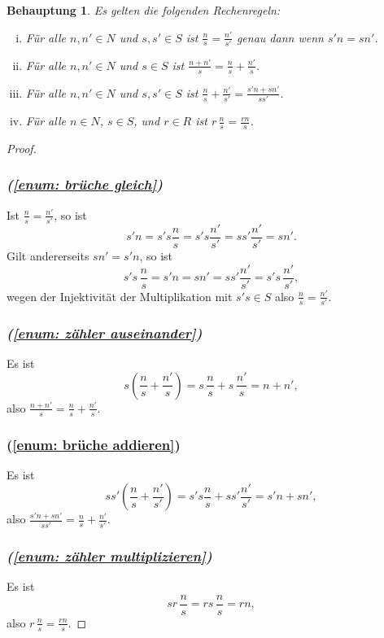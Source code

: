 \documentclass[a4paper,10pt]{article}
\newcounter{satze}
\newtheorem{beh}[satze]{Behauptung}
\theoremstyle{definition}
\begin{document}
\begin{beh}
 Es gelten die folgenden Rechenregeln:
 \begin{enumerate}[(i)]
  \item Für alle $n, n' \in N$ und $s, s' \in S$ ist $\frac{n}{s} = \frac{n'}{s'}$ genau dann wenn $s'n = sn'$. \label{enum: brüche gleich}
  \item Für alle $n, n' \in N$ und $s \in S$ ist $\frac{n+n'}{s} = \frac{n}{s} + \frac{n'}{s}$. \label{enum: zähler auseinander}
  \item Für alle $n, n' \in N$ und $s, s' \in S$ ist $\frac{n}{s} + \frac{n'}{s'} = \frac{s'n + sn'}{ss'}$. \label{enum: brüche addieren}
  \item Für alle $n \in N$, $s \in S$, und $r \in R$ ist $r\, \frac{n}{s} = \frac{rn}{s}$. \label{enum: zähler multiplizieren}
 \end{enumerate}
\end{beh}
\begin{proof}
 \subsubsection*{\emph{(\ref{enum: brüche gleich})}}
 Ist $\frac{n}{s} = \frac{n'}{s'}$, so ist
 \[
  s'n = s's\frac{n}{s} = s's\frac{n'}{s'} = ss'\frac{n'}{s'} = sn'.
 \]
 Gilt andererseits $sn' = s'n$, so ist
 \[
  s's \, \frac{n}{s} = s'n = sn' = ss'\frac{n'}{s'} = s's \, \frac{n'}{s'},
 \]
 wegen der Injektivität der Multiplikation mit $s's \in S$ also $\frac{n}{s} = \frac{n'}{s'}$.
 \subsubsection*{\emph{(\ref{enum: zähler auseinander})}}
 Es ist
 \[
  s\left( \frac{n}{s} + \frac{n'}{s} \right)
  = s \, \frac{n}{s} + s \, \frac{n'}{s}
  = n + n',
 \]
 also $\frac{n+n'}{s} = \frac{n}{s} + \frac{n'}{s}$.
 \subsubsection*{\emph{}(\ref{enum: brüche addieren})}
 Es ist
 \[
  ss' \left( \frac{n}{s} + \frac{n'}{s'} \right)
  = s' s \frac{n}{s} + s s' \frac{n'}{s'}
  = s' n + s n',
 \]
 also $\frac{s' n + s n'}{ss'} = \frac{n}{s} + \frac{n'}{s'}$.
 \subsubsection*{\emph{(\ref{enum: zähler multiplizieren})}}
 Es ist
 \[
  s r \, \frac{n}{s}
  = r s \, \frac{n}{s}
  = rn,
 \]
 also $r \, \frac{n}{s} = \frac{rn}{s}$.
\end{proof}
\end{document}
